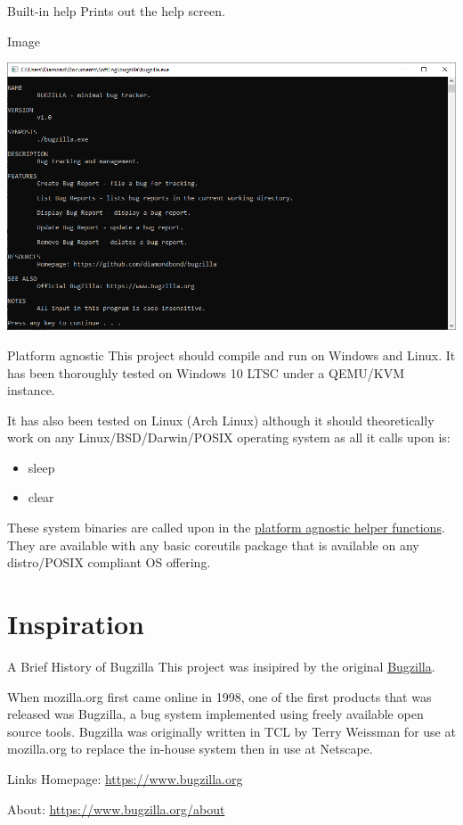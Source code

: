 \documentclass[bigger]{beamer}
\begin{document}
\begin{frame}[label={sec:orgcc5d84a}]{Built-in help}
Prints out the help screen.
\begin{block}{Image}
\begin{center}
\includegraphics[width=.9\linewidth]{../img/help.png}
\end{center}
\end{block}
\end{frame}
\begin{frame}[label={sec:orgc061064}]{Platform agnostic}
This project should compile and run on Windows and Linux.
It has been thoroughly tested on Windows 10 LTSC under a QEMU/KVM instance.

It has also been tested on Linux (Arch Linux) although it should theoretically work on any Linux/BSD/Darwin/POSIX operating system as all it calls upon is:
\begin{itemize}
\item sleep
\item clear
\end{itemize}

These system binaries are called upon in the \href{bugzilla.cpp}{platform agnostic helper functions}.
They are available with any basic coreutils package that is available on any distro/POSIX compliant OS offering.
\end{frame}

\section{Inspiration}
\label{sec:orgbd6bbb9}
\begin{frame}[label={sec:orgde77190}]{A Brief History of Bugzilla}
This project was insipired by the original \href{https://www.bugzilla.org}{Bugzilla}.

When mozilla.org first came online in 1998, one of the first products that was released was Bugzilla, a bug system implemented using freely available open source tools. Bugzilla was originally written in TCL by Terry Weissman for use at mozilla.org to replace the in-house system then in use at Netscape. 
\end{frame}

\begin{frame}[label={sec:orgfee5354}]{Links}
Homepage: \url{https://www.bugzilla.org}

About: \url{https://www.bugzilla.org/about}
\end{frame}
\end{document}
